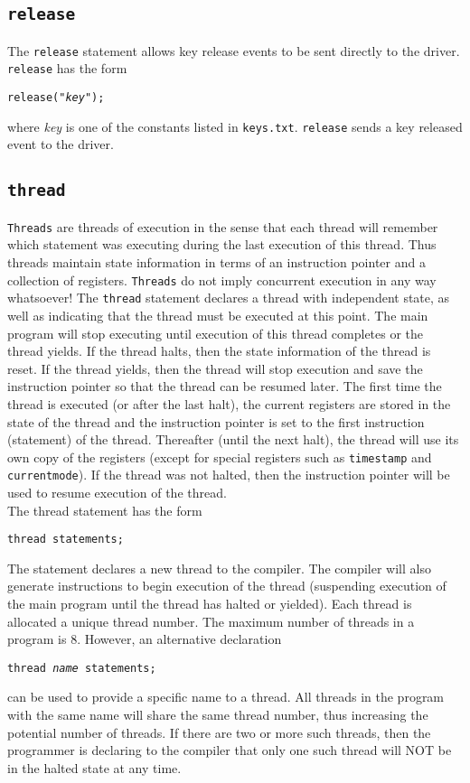 \documentclass{article}
\begin{document}
\subsection{{\tt release}}
The {\tt release} statement allows key release events to be sent
directly to the driver. {\tt release} has
the form
\begin{center}
	{\tt release("{\it key}");}
\end{center}
where {\it key} is one of the constants listed in {\tt keys.txt}.
{\tt release} sends a key released event to the driver.
\subsection{{\tt thread}}
\label{sec:thread}
{\tt Threads} are threads of execution in the sense that each thread
will remember which statement was executing during the last execution
of this thread. Thus threads maintain state information in terms
of an instruction pointer and a collection of registers. {\tt Threads}
do not imply concurrent execution in any way whatsoever! The {\tt thread}
statement declares a thread with independent state, as well as
indicating that the thread must be executed at this point. The
main program will stop executing until execution of this thread completes
or the thread yields. If the thread halts, then the state information
of the thread is reset. If the thread yields, then the thread will
stop execution and save the instruction pointer so that the 
thread can be resumed later. The first time the thread is executed (or after 
the last halt), the current registers are stored in the state
of the thread and the instruction pointer is set to the
first instruction (statement) of the thread. Thereafter (until the next halt), the thread will use
its own copy of the registers (except for special registers such as {\tt timestamp}
and {\tt currentmode}). If the thread was not halted, then the instruction
pointer will be used to resume execution of the thread.\\

The thread statement has the form
\begin{center}
	{\tt thread statements;}
\end{center}
The statement declares a new thread to the compiler. The compiler will also 
generate instructions to begin execution of the thread (suspending execution
of the main program until the thread has halted or yielded).
Each thread is allocated a unique thread number. The maximum number of threads
in a program is 8. However, an alternative declaration
\begin{center}
	{\tt thread {\it name} statements;}
\end{center}
can be used to provide a specific name to a thread. All threads in the
program with the same name will share the same thread number, thus increasing
the potential number of threads. If there are two or more such threads, then
the programmer is declaring to the compiler that only one such
thread will NOT be in the halted state at any time.
\end{document}
